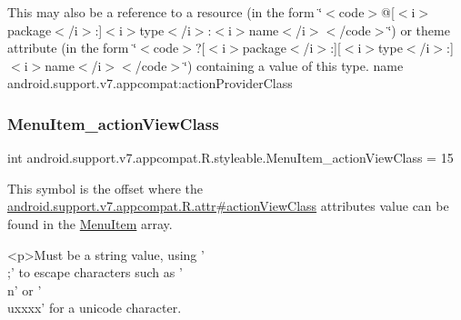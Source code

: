 This may also be a reference to a resource (in the form \char`\"{}$<$code$>$@\mbox{[}$<$i$>$package$<$/i$>$\+:\mbox{]}$<$i$>$type$<$/i$>$\+:$<$i$>$name$<$/i$>$$<$/code$>$\char`\"{}) or theme attribute (in the form \char`\"{}$<$code$>$?\mbox{[}$<$i$>$package$<$/i$>$\+:\mbox{]}\mbox{[}$<$i$>$type$<$/i$>$\+:\mbox{]}$<$i$>$name$<$/i$>$$<$/code$>$\char`\"{}) containing a value of this type.  name android.\+support.\+v7.\+appcompat\+:action\+Provider\+Class \mbox{\label{classandroid_1_1support_1_1v7_1_1appcompat_1_1R_1_1styleable_aa4c4c88d63a6e2feeb8ed1bf4b4ee9ed}} 
\subsubsection{\texorpdfstring{Menu\+Item\+\_\+action\+View\+Class}{MenuItem\_actionViewClass}}
{\footnotesize\ttfamily int android.\+support.\+v7.\+appcompat.\+R.\+styleable.\+Menu\+Item\+\_\+action\+View\+Class = 15\hspace{0.3cm}{\ttfamily [static]}}

This symbol is the offset where the \hyperlink{classandroid_1_1support_1_1v7_1_1appcompat_1_1R_1_1attr_a6d5e3aa635822a1187f7a25addca2321}{android.\+support.\+v7.\+appcompat.\+R.\+attr\#action\+View\+Class} attribute\textquotesingle{}s value can be found in the \hyperlink{classandroid_1_1support_1_1v7_1_1appcompat_1_1R_1_1styleable_a3161bf75811c963572105d304c98b088}{Menu\+Item} array.

\begin{DoxyVerb}      <p>Must be a string value, using '\\;' to escape characters such as '\\n' or '\\uxxxx' for a unicode character.
\end{DoxyVerb}
 

